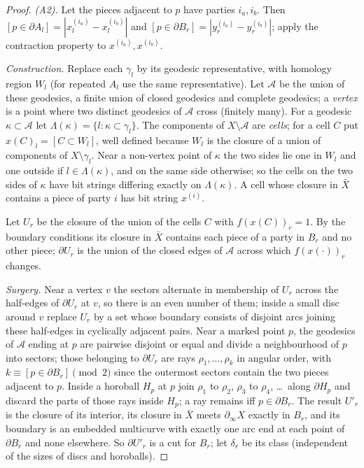 \documentclass[aps,prd,onecolumn,superscriptaddress,nofootinbib,amsmath,amssymb,11pt]{revtex4-2}
\theoremstyle{definition}
\begin{document}
\begin{proof}
\emph{(A2).} Let the pieces adjacent to $p$ have parties $i_a,i_b$. Then $[p\in\partial A_l]=|x^{(i_a)}_l-x^{(i_b)}_l|$
and $[p\in\partial B_r]=|y^{(i_a)}_r-y^{(i_b)}_r|$; apply the contraction property to $x^{(i_a)},x^{(i_b)}$.

\emph{Construction.} Replace each $\gamma_l$ by its geodesic representative, with homology region $W_l$ (for
repeated $A_l$ use the same representative). Let $\mathcal{A}$ be the union of these geodesics, a finite union of
closed geodesics and complete geodesics; a \emph{vertex} is a point where two distinct geodesics of $\mathcal A$
cross (finitely many). For a geodesic $\kappa\subset\mathcal A$ let $\Lambda(\kappa)=\{l:\kappa\subset\gamma_l\}$.
The components of $X\setminus\mathcal A$ are \emph{cells}; for a cell $C$ put $x(C)_l=[C\subset W_l]$, well defined
because $W_l$ is the closure of a union of components of $X\setminus\gamma_l$. Near a non-vertex point of $\kappa$
the two sides lie one in $W_l$ and one outside if $l\in\Lambda(\kappa)$, and on the same side otherwise; so the
cells on the two sides of $\kappa$ have bit strings differing exactly on $\Lambda(\kappa)$. A cell whose closure in
$\bar X$ contains a piece of party $i$ has bit string $x^{(i)}$.

Let $U_r$ be the closure of the union of the cells $C$ with $f(x(C))_r=1$. By the boundary conditions its
closure in $\bar X$ contains each piece of a party in $B_r$ and no other piece; $\partial U_r$ is the union of the
closed edges of $\mathcal A$ across which $f(x(\cdot))_r$ changes.

\emph{Surgery.} Near a vertex $v$ the sectors alternate in membership of $U_r$ across the half-edges of
$\partial U_r$ at $v$, so there is an even number of them; inside a small disc around $v$ replace $U_r$ by a set
whose boundary consists of disjoint arcs joining these half-edges in cyclically adjacent pairs. Near a marked
point $p$, the geodesics of $\mathcal A$ ending at $p$ are pairwise disjoint or equal and divide a neighbourhood
of $p$ into sectors; those belonging to $\partial U_r$ are rays $\rho_1,\dots,\rho_k$ in angular order, with
$k\equiv[p\in\partial B_r]\pmod 2$ since the outermost sectors contain the two pieces adjacent to $p$. Inside a
horoball $H_p$ at $p$ join $\rho_1$ to $\rho_2$, $\rho_3$ to $\rho_4$, \dots\ along $\partial H_p$ and discard the
parts of those rays inside $H_p$; a ray remains iff $p\in\partial B_r$. The result $U'_r$ is the closure of its
interior, its closure in $\bar X$ meets $\partial_\infty X$ exactly in $B_r$, and its boundary is an embedded
multicurve with exactly one arc end at each point of $\partial B_r$ and none elsewhere. So $\partial U'_r$ is a cut
for $B_r$; let $\delta_r$ be its class (independent of the sizes of discs and horoballs).


\end{proof}
\end{document}
